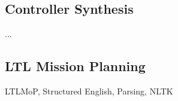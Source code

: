 \subsection{Controller Synthesis}

...

\subsection{LTL Mission Planning}

LTLMoP, Structured English, Parsing, NLTK